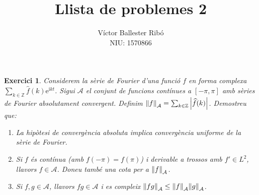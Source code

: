 \documentclass[10pt,a4paper]{article}
\title{\bfseries\Large Llista de problemes 2}
\author{Víctor Ballester Ribó\\NIU: 1570866}
\date{\parbox{\linewidth}{\centering
  Anàlisi Harmònica\endgraf
  Grau en Matemàtiques\endgraf
  Universitat Autònoma de Barcelona\endgraf
  Març de 2023}}
\newcommand{\ZZ}{\ensuremath{\mathbb{Z}}} %
\newcommand{\ii}{\mathrm{i}} %
\newtheorem{exercici}{Exercici}
\theoremstyle{definition}
\theoremstyle{remark}
\renewcommand{\exp}[1]{\mathrm{e}^{#1}} %
\begin{document}
\maketitle
\begin{exercici}
  Considerem la sèrie de Fourier d'una funció $f$ en forma complexa $\sum_{k\in\ZZ}\widehat{f}(k)\exp{\ii kt}$. Sigui $\mathcal{A}$ el conjunt de funcions contínues a $[-\pi,\pi]$ amb sèries de Fourier absolutament convergent. Definim $\norm{f}_{\mathcal{A}}=\sum_{k\in\ZZ}\abs{\widehat{f}(k)}$. Demostreu que:
  \begin{enumerate}
    \item La hipòtesi de convergència absoluta implica convergència uniforme de la sèrie de Fourier.
    \item Si $f$ és contínua (amb $f(-\pi)=f(\pi)$) i derivable a trossos amb $f'\in L^2$, llavors $f\in\mathcal{A}$. Doneu també una cota per a $\norm{f}_{\mathcal{A}}$.
    \item Si $f,g\in\mathcal{A}$, llavors $fg\in\mathcal{A}$ i es compleix $\norm{fg}_{\mathcal{A}}\leq \norm{f}_{\mathcal{A}}\norm{g}_{\mathcal{A}}$.
  \end{enumerate}
\end{exercici}
\end{document}
